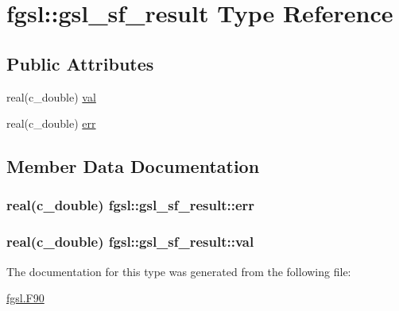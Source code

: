 \hypertarget{structfgsl_1_1gsl__sf__result}{}\section{fgsl\+:\+:gsl\+\_\+sf\+\_\+result Type Reference}
\label{structfgsl_1_1gsl__sf__result}
\subsection*{Public Attributes}
\begin{DoxyCompactItemize}
\item 
real(c\+\_\+double) \hyperlink{structfgsl_1_1gsl__sf__result_a3cf49c46128f015cdb174291cf9b10fb}{val}
\item 
real(c\+\_\+double) \hyperlink{structfgsl_1_1gsl__sf__result_ae5dd18e3633341000bf91b4fc186ac24}{err}
\end{DoxyCompactItemize}


\subsection{Member Data Documentation}
\hypertarget{structfgsl_1_1gsl__sf__result_ae5dd18e3633341000bf91b4fc186ac24}{}
\subsubsection[{err}]{\setlength{\rightskip}{0pt plus 5cm}real(c\+\_\+double) fgsl\+::gsl\+\_\+sf\+\_\+result\+::err}\label{structfgsl_1_1gsl__sf__result_ae5dd18e3633341000bf91b4fc186ac24}
\hypertarget{structfgsl_1_1gsl__sf__result_a3cf49c46128f015cdb174291cf9b10fb}{}
\subsubsection[{val}]{\setlength{\rightskip}{0pt plus 5cm}real(c\+\_\+double) fgsl\+::gsl\+\_\+sf\+\_\+result\+::val}\label{structfgsl_1_1gsl__sf__result_a3cf49c46128f015cdb174291cf9b10fb}


The documentation for this type was generated from the following file\+:\begin{DoxyCompactItemize}
\item 
\hyperlink{fgsl_8F90}{fgsl.\+F90}\end{DoxyCompactItemize}
